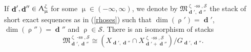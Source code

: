 \documentclass[a4paper,10pt]{amsart}
\renewcommand{\zeta}{\upzeta}
\renewcommand{\rho}{\uprho}
\renewcommand{\chi}{\upchi}
\renewcommand{\Lambda}{\Uplambda}
\renewcommand{\mu}{\upmu}
\newcommand{\SP}{\mathcal{S}}
\newcommand{\Mst}{\mathfrak{M}}
\DeclareMathOperator{\sst}{-ss}
\DeclareMathOperator{\dd}{\mathbf{d}}
\begin{document}
\smallbreak
If $\dd',\dd''\in\Lambda_{\mu}^{\zeta}$ for some $\mu\in(-\infty,\infty)$, we denote by $\Mst_{\dd',\dd''}^{\zeta\sst,\SP}$ the stack of short exact sequences as in (\ref{rhoses}) such that $\dim(\rho')=\dd'$, $\dim(\rho'')=\dd''$ and $\rho\in\SP$.  There is an isomorphism of stacks
\[
\Mst_{\dd',\dd''}^{\zeta\sst,\SP}\cong \left(X_{\dd',\dd''}\cap X_{\dd'+\dd''}^{\zeta\sst,\SP}\right)/G_{\dd',\dd''}.
\]
\end{document}
